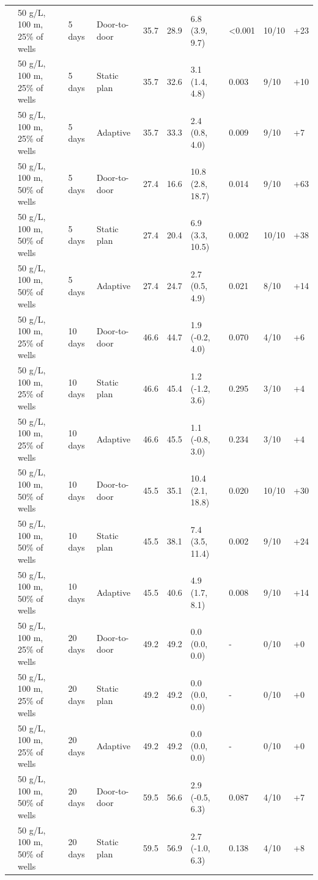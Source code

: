 \documentclass[sustainability,article,submit,pdftex,moreauthors]{Definitions/mdpi}
\begin{document}
{\begin{longtable}{L{3.0cm}L{2.0cm}L{1.0cm}L{1.6cm}R{1.0cm}R{1.4cm}L{2.4cm}R{0.9cm}R{0.8cm}R{0.9cm}}
 & 50 \textmu{}g/L, 100 m, 25\% of wells & 5 days & Door-to-door & 35.7 & 28.9 & 6.8 (3.9, 9.7) & <0.001 & 10/10 & +23 \\
 & 50 \textmu{}g/L, 100 m, 25\% of wells & 5 days & Static plan & 35.7 & 32.6 & 3.1 (1.4, 4.8) & 0.003 & 9/10 & +10 \\
 & 50 \textmu{}g/L, 100 m, 25\% of wells & 5 days & Adaptive & 35.7 & 33.3 & 2.4 (0.8, 4.0) & 0.009 & 9/10 & +7 \\
 & 50 \textmu{}g/L, 100 m, 50\% of wells & 5 days & Door-to-door & 27.4 & 16.6 & 10.8 (2.8, 18.7) & 0.014 & 9/10 & +63 \\
 & 50 \textmu{}g/L, 100 m, 50\% of wells & 5 days & Static plan & 27.4 & 20.4 & 6.9 (3.3, 10.5) & 0.002 & 10/10 & +38 \\
 & 50 \textmu{}g/L, 100 m, 50\% of wells & 5 days & Adaptive & 27.4 & 24.7 & 2.7 (0.5, 4.9) & 0.021 & 8/10 & +14 \\
 & 50 \textmu{}g/L, 100 m, 25\% of wells & 10 days & Door-to-door & 46.6 & 44.7 & 1.9 (-0.2, 4.0) & 0.070 & 4/10 & +6 \\
 & 50 \textmu{}g/L, 100 m, 25\% of wells & 10 days & Static plan & 46.6 & 45.4 & 1.2 (-1.2, 3.6) & 0.295 & 3/10 & +4 \\
 & 50 \textmu{}g/L, 100 m, 25\% of wells & 10 days & Adaptive & 46.6 & 45.5 & 1.1 (-0.8, 3.0) & 0.234 & 3/10 & +4 \\
 & 50 \textmu{}g/L, 100 m, 50\% of wells & 10 days & Door-to-door & 45.5 & 35.1 & 10.4 (2.1, 18.8) & 0.020 & 10/10 & +30 \\
 & 50 \textmu{}g/L, 100 m, 50\% of wells & 10 days & Static plan & 45.5 & 38.1 & 7.4 (3.5, 11.4) & 0.002 & 9/10 & +24 \\
 & 50 \textmu{}g/L, 100 m, 50\% of wells & 10 days & Adaptive & 45.5 & 40.6 & 4.9 (1.7, 8.1) & 0.008 & 9/10 & +14 \\
 & 50 \textmu{}g/L, 100 m, 25\% of wells & 20 days & Door-to-door & 49.2 & 49.2 & 0.0 (0.0, 0.0) & - & 0/10 & +0 \\
 & 50 \textmu{}g/L, 100 m, 25\% of wells & 20 days & Static plan & 49.2 & 49.2 & 0.0 (0.0, 0.0) & - & 0/10 & +0 \\
 & 50 \textmu{}g/L, 100 m, 25\% of wells & 20 days & Adaptive & 49.2 & 49.2 & 0.0 (0.0, 0.0) & - & 0/10 & +0 \\
 & 50 \textmu{}g/L, 100 m, 50\% of wells & 20 days & Door-to-door & 59.5 & 56.6 & 2.9 (-0.5, 6.3) & 0.087 & 4/10 & +7 \\
 & 50 \textmu{}g/L, 100 m, 50\% of wells & 20 days & Static plan & 59.5 & 56.9 & 2.7 (-1.0, 6.3) & 0.138 & 4/10 & +8 \\

\end{longtable}}
\end{document}
